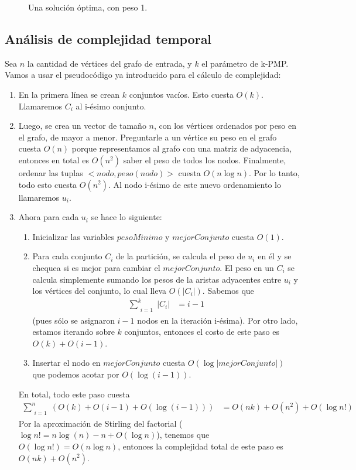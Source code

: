 \begin{figure}[H]
\begin{minipage}[t]{0.5\linewidth}
		\caption{Una solución óptima, con peso 1.}
		\label{fig:ej3_rotura_optima}
	\end{minipage}
\end{figure}

\subsection{Análisis de complejidad temporal}

Sea $n$ la cantidad de vértices del grafo de entrada, y $k$ el parámetro de k-PMP. Vamos a usar el pseudocódigo ya introducido para el cálculo de complejidad:
\begin{enumerate}
    \item En la primera línea se crean $k$ conjuntos vacíos. Esto cuesta $O(k)$. Llamaremos $C_i$ al i-ésimo conjunto.
    \item Luego, se crea un vector de tamaño $n$, con los vértices ordenados por peso en el grafo, de mayor a menor. Preguntarle a un vértice su peso en el grafo cuesta $O(n)$ porque representamos al grafo con una matriz de adyacencia, entonces en total es $O(n^2)$ saber el peso de todos los nodos. Finalmente, ordenar las tuplas $<nodo,peso(nodo)>$ cuesta $O(n \log n)$. Por lo tanto, todo esto cuesta $O(n^2)$. Al nodo i-ésimo de este nuevo ordenamiento lo llamaremos $u_i$.
    \item Ahora para cada $u_i$ se hace lo siguiente:
        \begin{enumerate}
            \item Inicializar las variables $pesoMinimo$ y $mejorConjunto$ cuesta $O(1)$.
            \item Para cada conjunto $C_i$ de la partición, se calcula el peso de $u_i$ en él y se chequea si es mejor para cambiar el $mejorConjunto$. El peso en un $C_i$ se calcula simplemente sumando los pesos de la aristas adyacentes entre $u_i$ y los vértices del conjunto, lo cual lleva $O(|C_i|)$. Sabemos que
            \begin{align*}
                \sum\limits_{\substack{i = 1}}^k |C_i| &= i - 1
            \end{align*}
            (pues sólo se asignaron $i - 1$ nodos en la iteración i-ésima). Por otro lado, estamos iterando sobre $k$ conjuntos, entonces el costo de este paso es $O(k) + O(i - 1)$.
            \item Insertar el nodo en $mejorConjunto$ cuesta $O(\log |mejorConjunto|)$ que podemos acotar por $O(\log (i - 1))$.
        \end{enumerate}
        En total, todo este paso cuesta
        \begin{align*}
                \sum\limits_{\substack{i = 1}}^n (O(k) + O(i-1) + O(\log (i - 1))) &= O(nk) + O(n^2) + O(\log n!)
        \end{align*}
        Por la aproximación de Stirling del factorial ($\log n! = n \log(n) - n + O(\log n)$), tenemos que $O(\log n!) = O(n \log n)$, entonces la complejidad total de este paso es $O(nk) + O(n^2)$.
\end{enumerate}
